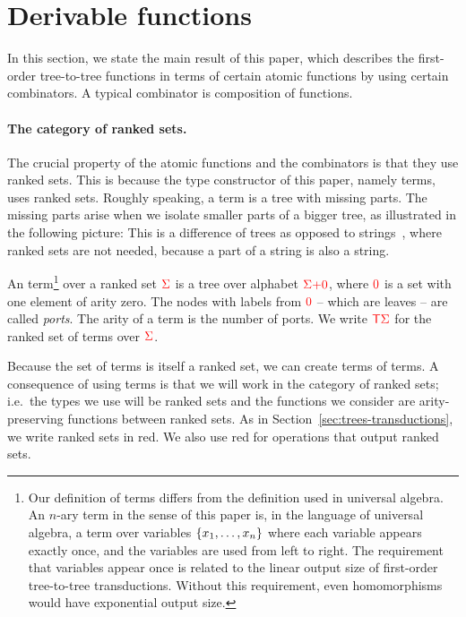 \section{Derivable functions}
In this section, we state the main result of this paper, which describes  the  first-order tree-to-tree functions in terms of  certain atomic functions by using certain combinators.  A typical combinator is composition of functions.

\paragraph*{The category of ranked sets.}
The crucial property of the atomic functions and  the combinators is that they use ranked sets. This is because the type constructor of this paper, namely terms, uses ranked sets.  Roughly speaking, a term is a tree with missing parts. The missing parts arise when we  isolate smaller parts of a bigger tree, as illustrated in the following picture:
This is a difference of trees as opposed to strings~\cite{bojanczykRegularFirstOrderList2018}, where ranked sets are not needed, because a part of a string is also a string.


\begin{definition}[Terms]\label{def:terms}
    An  term\footnote{
        Our definition of terms differs from the definition used in universal algebra. An $n$-ary term in the sense of this paper is, in the language of universal algebra, a term over variables $\{x_1,\ldots,x_n\}$ where each variable appears exactly once, and the variables are used from left to right.  The requirement that variables appear  once is related to the linear output size of first-order tree-to-tree transductions. Without this requirement, even homomorphisms would have exponential output size. 
    } over a ranked set ${\color{red}{\Sigma}}$ is a tree over alphabet ${\color{red}{\Sigma}} {\color{red}{+}} {{\color{red}{ 0}}}$, where ${{\color{red}{ 0}}}$ is a set with one element of arity zero.  The nodes with labels from ${{\color{red}{ 0}}}$  -- which are leaves --  are called \emph{ports}. The arity of a term is the number of ports.  We write ${\color{red}{\mathsf T}} {\color{red}{\Sigma}}$ for the ranked set of terms over ${\color{red}{\Sigma}}$.  
\end{definition}



Because the set of terms is itself a ranked set,  we can create terms of terms.         A consequence of using terms is that we will work in the category of ranked sets; i.e.~the types we use will be ranked sets and the functions we consider are arity-preserving functions between ranked sets. As in Section~\ref{sec:trees-transductions}, we write ranked sets in red. We also use red for operations that output ranked sets. 

